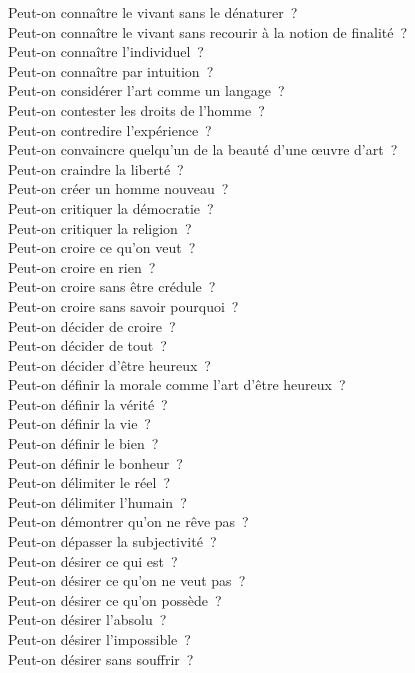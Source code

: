 \documentclass[a4paper,12pt]{article}
\begin{document}
Peut-on connaître le vivant sans le dénaturer ? \\
Peut-on connaître le vivant sans recourir à la notion de finalité ? \\
Peut-on connaître l'individuel ? \\
Peut-on connaître par intuition ? \\
Peut-on considérer l'art comme un langage ? \\
Peut-on contester les droits de l'homme ? \\
Peut-on contredire l'expérience ? \\
Peut-on convaincre quelqu'un de la beauté d'une œuvre d'art ? \\
Peut-on craindre la liberté ? \\
Peut-on créer un homme nouveau ? \\
Peut-on critiquer la démocratie ? \\
Peut-on critiquer la religion ? \\
Peut-on croire ce qu'on veut ? \\
Peut-on croire en rien ? \\
Peut-on croire sans être crédule ? \\
Peut-on croire sans savoir pourquoi ? \\
Peut-on décider de croire ? \\
Peut-on décider de tout ? \\
Peut-on décider d'être heureux ? \\
Peut-on définir la morale comme l'art d'être heureux ? \\
Peut-on définir la vérité ? \\
Peut-on définir la vie ? \\
Peut-on définir le bien ? \\
Peut-on définir le bonheur ? \\
Peut-on délimiter le réel ? \\
Peut-on délimiter l'humain ? \\
Peut-on démontrer qu'on ne rêve pas ? \\
Peut-on dépasser la subjectivité ? \\
Peut-on désirer ce qui est ? \\
Peut-on désirer ce qu'on ne veut pas ? \\
Peut-on désirer ce qu'on possède ? \\
Peut-on désirer l'absolu ? \\
Peut-on désirer l'impossible ? \\
Peut-on désirer sans souffrir ? \\
\end{document}
